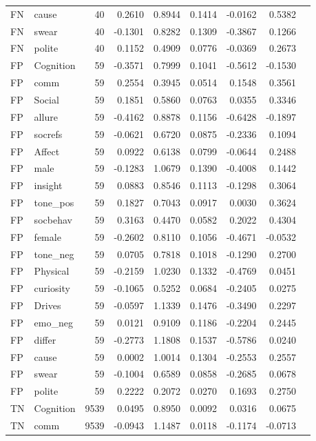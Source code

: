 \begin{longtable}{@{}llrrrrrrr@{}}
FN & cause & 40 & 0.2610 & 0.8944 & 0.1414 & -0.0162 & 0.5382 \\
FN & swear & 40 & -0.1301 & 0.8282 & 0.1309 & -0.3867 & 0.1266 \\
FN & polite & 40 & 0.1152 & 0.4909 & 0.0776 & -0.0369 & 0.2673 \\
FP & Cognition & 59 & -0.3571 & 0.7999 & 0.1041 & -0.5612 & -0.1530 \\
FP & comm & 59 & 0.2554 & 0.3945 & 0.0514 & 0.1548 & 0.3561 \\
FP & Social & 59 & 0.1851 & 0.5860 & 0.0763 & 0.0355 & 0.3346 \\
FP & allure & 59 & -0.4162 & 0.8878 & 0.1156 & -0.6428 & -0.1897 \\
FP & socrefs & 59 & -0.0621 & 0.6720 & 0.0875 & -0.2336 & 0.1094 \\
FP & Affect & 59 & 0.0922 & 0.6138 & 0.0799 & -0.0644 & 0.2488 \\
FP & male & 59 & -0.1283 & 1.0679 & 0.1390 & -0.4008 & 0.1442 \\
FP & insight & 59 & 0.0883 & 0.8546 & 0.1113 & -0.1298 & 0.3064 \\
FP & tone\_pos & 59 & 0.1827 & 0.7043 & 0.0917 & 0.0030 & 0.3624 \\
FP & socbehav & 59 & 0.3163 & 0.4470 & 0.0582 & 0.2022 & 0.4304 \\
FP & female & 59 & -0.2602 & 0.8110 & 0.1056 & -0.4671 & -0.0532 \\
FP & tone\_neg & 59 & 0.0705 & 0.7818 & 0.1018 & -0.1290 & 0.2700 \\
FP & Physical & 59 & -0.2159 & 1.0230 & 0.1332 & -0.4769 & 0.0451 \\
FP & curiosity & 59 & -0.1065 & 0.5252 & 0.0684 & -0.2405 & 0.0275 \\
FP & Drives & 59 & -0.0597 & 1.1339 & 0.1476 & -0.3490 & 0.2297 \\
FP & emo\_neg & 59 & 0.0121 & 0.9109 & 0.1186 & -0.2204 & 0.2445 \\
FP & differ & 59 & -0.2773 & 1.1808 & 0.1537 & -0.5786 & 0.0240 \\
FP & cause & 59 & 0.0002 & 1.0014 & 0.1304 & -0.2553 & 0.2557 \\
FP & swear & 59 & -0.1004 & 0.6589 & 0.0858 & -0.2685 & 0.0678 \\
FP & polite & 59 & 0.2222 & 0.2072 & 0.0270 & 0.1693 & 0.2750 \\
TN & Cognition & 9539 & 0.0495 & 0.8950 & 0.0092 & 0.0316 & 0.0675 \\
TN & comm & 9539 & -0.0943 & 1.1487 & 0.0118 & -0.1174 & -0.0713 \\

\end{longtable}
